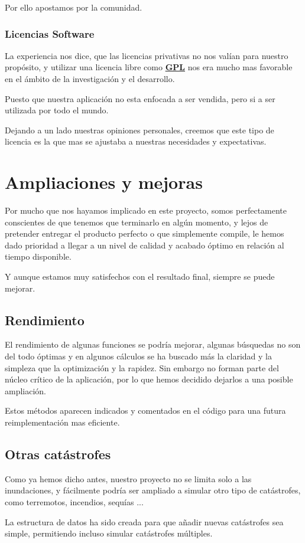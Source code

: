 Por ello apostamos por la comunidad.
\subsubsection*{Licencias Software}
La experiencia nos dice, que las licencias privativas no nos valían para
nuestro propósito, y utilizar una licencia libre como \hyperref[ap1]{\bf
GPL} nos era mucho mas
favorable en el ámbito de la investigación y el desarrollo.

Puesto que nuestra aplicación no esta enfocada a ser vendida, pero si a ser
utilizada por todo el mundo.

Dejando a un lado nuestras opiniones personales, creemos que este tipo de
licencia es la que mas se ajustaba a nuestras necesidades y expectativas.
\section*{Ampliaciones y mejoras}
Por  mucho que nos hayamos implicado en este proyecto, somos perfectamente
conscientes de que tenemos que terminarlo en algún momento, y lejos de
pretender entregar el producto perfecto o que simplemente compile, le hemos
dado prioridad a llegar a un nivel de calidad y acabado óptimo en relación al
tiempo disponible.

Y aunque estamos muy satisfechos con el resultado final, siempre se puede
mejorar.
\subsection*{Rendimiento}
El rendimiento de algunas funciones se podría mejorar, algunas búsquedas no son
del todo óptimas y en algunos cálculos se ha buscado más la claridad y la
simpleza que la optimización y la rapidez. Sin embargo no forman parte del
núcleo crítico de la aplicación, por lo que hemos decidido dejarlos a una
posible ampliación. 

Estos métodos aparecen indicados y comentados en el código para una futura
reimplementación mas eficiente.
\subsection*{Otras catástrofes}
Como ya hemos dicho antes, nuestro proyecto no se limita solo a las
inundaciones, y fácilmente podría ser ampliado a simular otro tipo de
catástrofes, como terremotos, incendios, sequías ...

La estructura de datos ha sido creada para que añadir nuevas catástrofes sea
simple, permitiendo incluso simular catástrofes múltiples.
